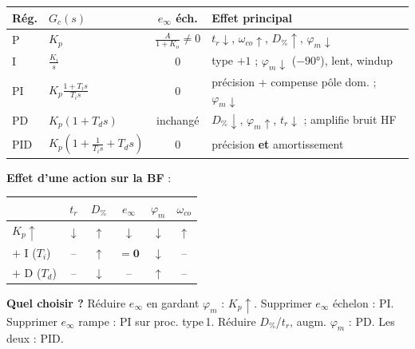 \begin{tcolorbox}[colback=ch6teal!5,colframe=ch6teal!80!black,title={R\'egulateurs : comparatif, effets \& choix}]
\renewcommand{\arraystretch}{1.18}
\scriptsize
\begin{tabularx}{\linewidth}{@{}l l c >{\raggedright\arraybackslash}X@{}}
\toprule
R\'eg. & $G_c(s)$ & $e_\infty$ \'ech. & Effet principal \\
\midrule
P   & $K_p$ & $\frac{A}{1+K_o}{\neq}0$ & $t_r{\downarrow}$, $\omega_{co}{\uparrow}$, $D_\%{\uparrow}$, $\varphi_m{\downarrow}$ \\
I   & $\frac{K_i}{s}$ & $0$ & type $+1$ ; $\varphi_m{\downarrow}$ ($-90°$), lent, windup \\
PI  & $K_p\frac{1{+}T_i s}{T_i s}$ & $0$ & pr\'ecision + compense p\^ole dom. ; $\varphi_m{\downarrow}$ \\
PD  & $K_p(1{+}T_d s)$ & inchang\'e & $D_\%{\downarrow}$, $\varphi_m{\uparrow}$, $t_r{\downarrow}$ ; amplifie bruit HF \\
PID & $K_p(1{+}\tfrac{1}{T_i s}{+}T_d s)$ & $0$ & pr\'ecision \textbf{et} amortissement \\
\bottomrule
\end{tabularx}
\par\smallskip
\textbf{Effet d'une action sur la BF} :
\begin{center}
\renewcommand{\arraystretch}{1.1}
\scriptsize
\begin{tabular}{@{}lccccc@{}}
\toprule
 & $t_r$ & $D_\%$ & $e_\infty$ & $\varphi_m$ & $\omega_{co}$ \\
\midrule
$K_p \uparrow$ & $\downarrow$ & $\uparrow$ & $\downarrow$ & $\downarrow$ & $\uparrow$ \\
$+$ I ($T_i$) & -- & $\uparrow$ & $\boldsymbol{= 0}$ & $\downarrow$ & -- \\
$+$ D ($T_d$) & -- & $\downarrow$ & -- & $\uparrow$ & -- \\
\bottomrule
\end{tabular}
\end{center}
\textbf{Quel choisir ?} R\'eduire $e_\infty$ en gardant $\varphi_m$ : $K_p\uparrow$. Supprimer $e_\infty$ \'echelon : PI. Supprimer $e_\infty$ rampe : PI sur proc. type\,1. R\'eduire $D_\%$/$t_r$, augm. $\varphi_m$ : PD. Les deux : PID.
\end{tcolorbox}

